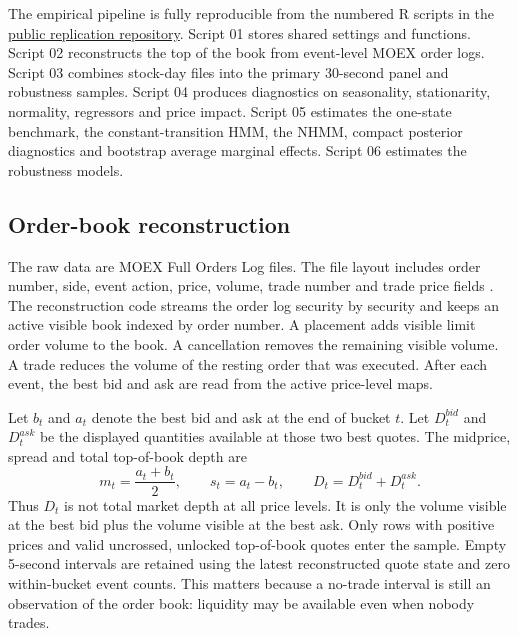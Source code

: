 \documentclass[12pt,a4paper]{article}
\begin{document}
The empirical pipeline is fully reproducible from the numbered R scripts in the \href{https://github.com/nikolajtagin/regime-dependent-price-impact-in-the-moex-limit-order-book}{public replication repository}. Script 01 stores shared settings and functions. Script 02 reconstructs the top of the book from event-level MOEX order logs. Script 03 combines stock-day files into the primary 30-second panel and robustness samples. Script 04 produces diagnostics on seasonality, stationarity, normality, regressors  and price impact. Script 05 estimates the one-state benchmark, the constant-transition HMM, the NHMM, compact posterior diagnostics  and bootstrap average marginal effects. Script 06 estimates the robustness models.

\subsection{Order-book reconstruction}\label{sec:reconstruction}

The raw data are MOEX Full Orders Log files. The file layout includes order number, side, event action, price, volume, trade number  and trade price fields \citep{MOEXFullOrdersLog}. The reconstruction code streams the order log security by security and keeps an active visible book indexed by order number. A placement adds visible limit order volume to the book. A cancellation removes the remaining visible volume. A trade reduces the volume of the resting order that was executed. After each event, the best bid and ask are read from the active price-level maps.

Let \(b_t\) and \(a_t\) denote the best bid and ask at the end of bucket \(t\). Let \(D^{bid}_t\) and \(D^{ask}_t\) be the displayed quantities available at those two best quotes. The midprice, spread  and total top-of-book depth are
\[
m_t=\frac{a_t+b_t}{2}, \qquad
s_t=a_t-b_t, \qquad
D_t=D^{bid}_t+D^{ask}_t .
\]
Thus \(D_t\) is not total market depth at all price levels. It is only the volume visible at the best bid plus the volume visible at the best ask.
Only rows with positive prices and valid uncrossed, unlocked top-of-book quotes enter the sample. Empty 5-second intervals are retained using the latest reconstructed quote state and zero within-bucket event counts. This matters because a no-trade interval is still an observation of the order book: liquidity may be available even when nobody trades.
\end{document}
